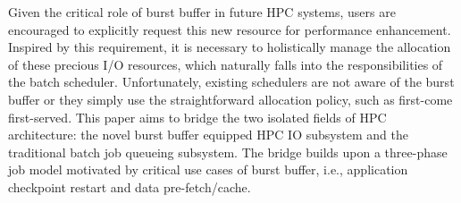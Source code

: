 

Given the critical role of burst buffer in future HPC systems,
users are encouraged to explicitly request this new resource for performance enhancement\cite{apex-workflow}.
Inspired by this requirement, it is necessary to holistically manage
the allocation of these precious I/O resources,
which naturally falls into the responsibilities of the batch scheduler.
Unfortunately, existing schedulers are not aware of the burst buffer\cite{Moab, Cobalt}
or they simply use the straightforward allocation policy, such as first-come first-served\cite{SlurmBBGuide}.
This paper aims to bridge the two isolated fields of HPC architecture:
the novel burst buffer equipped HPC IO subsystem and the
traditional batch job queueing subsystem.
The bridge builds upon a three-phase job model motivated by critical use cases of burst buffer,
i.e., application checkpoint restart and data pre-fetch/cache.

